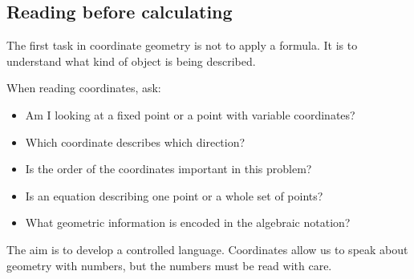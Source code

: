 \subsection*{Reading before calculating}

The first task in coordinate geometry is not to apply a formula. It is to understand what kind of object is being described.

\begin{summarybox}
When reading coordinates, ask:
\begin{itemize}
\item Am I looking at a fixed point or a point with variable coordinates?
\item Which coordinate describes which direction?
\item Is the order of the coordinates important in this problem?
\item Is an equation describing one point or a whole set of points?
\item What geometric information is encoded in the algebraic notation?
\end{itemize}
\end{summarybox}

The aim is to develop a controlled language. Coordinates allow us to speak about geometry with numbers, but the numbers must be read with care.